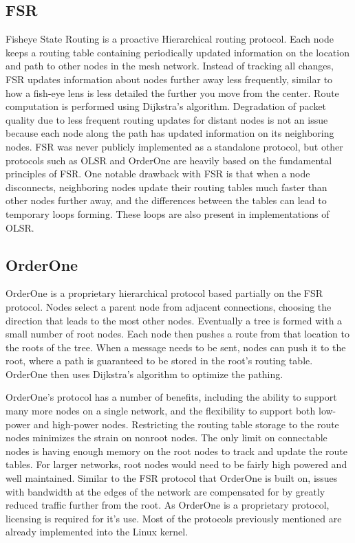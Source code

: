 \documentclass[conference]{IEEEtran}
\begin{document}
\subsection{FSR}
Fisheye State Routing is a proactive Hierarchical routing protocol. Each node keeps a routing table containing periodically updated information on the location and path to other nodes in the mesh network.  Instead of tracking all changes, FSR updates
information about nodes further away less frequently, similar to how a fish-eye lens is less detailed the further you move from the center\cite{enwiki:987177004}. Route computation is performed using Dijkstra's algorithm. Degradation of packet quality due to less frequent routing 
updates for distant nodes is not an issue because each node along the path has updated information on its neighboring nodes.  FSR was never publicly implemented as a standalone protocol, but other protocols such as OLSR and OrderOne are heavily based on
the fundamental principles of FSR. One notable drawback with FSR is that when a node disconnects, neighboring nodes update their routing tables much faster than other nodes further away, and the differences between the tables can lead to temporary loops forming.
These loops are also present in implementations of OLSR.
\subsection{OrderOne}
OrderOne is a proprietary hierarchical protocol based partially on the FSR protocol.  Nodes select a parent node from adjacent connections, choosing the direction that leads to the most other nodes. Eventually a tree is formed with a small number of root nodes.
Each node then pushes a route from that location to the roots of the tree. When a message needs to be sent, nodes can push it to the root, where a path is guaranteed to be stored in the root's routing table. OrderOne then uses Dijkstra's algorithm to optimize the pathing\cite{enwiki:618641168}.

OrderOne's protocol has a number of benefits, including the ability to support many more nodes on a single network, and the flexibility to support both low-power and high-power nodes\cite{boland_2007}. Restricting the routing table storage to the route nodes minimizes the strain on nonroot nodes.
The only limit on connectable nodes is having enough memory on the root nodes to track and update the route tables.  For larger networks, root nodes would need to be fairly high powered and well maintained.  Similar to the FSR protocol that OrderOne is built on, issues with bandwidth 
at the edges of the network are compensated for by greatly reduced traffic further from the root. As OrderOne is a proprietary protocol, licensing is required for it's use. Most of the protocols previously mentioned are already implemented into the Linux kernel.
\end{document}
